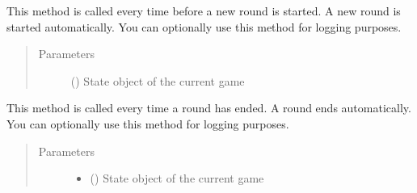 \documentclass[letterpaper,10pt,english]{sphinxmanual}
\begin{document}
\begin{fulllineitems}
\begin{fulllineitems}
\end{fulllineitems}


\begin{fulllineitems}
\label{\detokenize{agent:agent.PokerAgent.on_new_round_request}}
\pysigstartsignatures
{}
\pysigstopsignatures
\sphinxAtStartPar
This method is called every time before a new round is started. A new round is started automatically.
You can optionally use this method for logging purposes.
\begin{quote}\begin{description}
\item[{Parameters}] \leavevmode
\sphinxAtStartPar
{} ({\hyperref[\detokenize{client:client.state.ClientGameState}]{}}) \textendash{} State object of the current game

\end{description}\end{quote}

\end{fulllineitems}


\begin{fulllineitems}
\label{\detokenize{agent:agent.PokerAgent.on_round_end}}
\pysigstartsignatures
{}
\pysigstopsignatures
\sphinxAtStartPar
This method is called every time a round has ended. A round ends automatically. You can optionally use this
method for logging purposes.
\begin{quote}\begin{description}
\item[{Parameters}] \leavevmode\begin{itemize}
\item {} 
\sphinxAtStartPar
{} ({\hyperref[\detokenize{client:client.state.ClientGameState}]{}}) \textendash{} State object of the current game


\end{itemize}
\end{description}
\end{quote}
\end{fulllineitems}
\end{fulllineitems}
\end{document}

